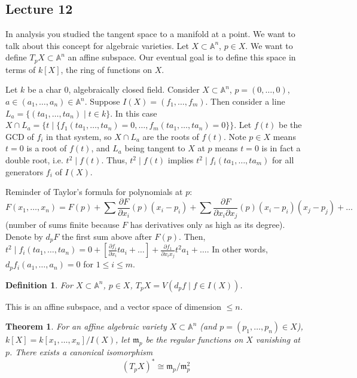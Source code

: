 \documentclass[12pt]{article}
\newcommand{\A}{\mathbb{A}}
\newcommand{\m}{\mathfrak{m}}
\newtheorem{definition}{Definition}[section]
\newtheorem{theorem}{Theorem}[section]
\begin{document}
    \subsection{Lecture 12}
    In analysis you studied the tangent space to a manifold at a point. We want to talk about this concept for algebraic varieties. Let $X \subset \A^n$, $p \in X$. We want to define $T_pX \subset \A^n$ an affine subspace. Our eventual goal is to define this space in terms of $k[X]$, the ring of functions on $X$. \par
    Let $k$ be a char 0, algebraically closed field. Consider $X \subset \A^n$, $p = (0, \dots, 0)$, $a \in (a_1, \dots, a_n) \in \A^n$. Suppose $I(X) = (f_1, \dots, f_m)$. Then consider a line $L_a = \{(ta_1, \dots, ta_n) \mid t \in k\}$. In this case $X \cap L_a = \{t \mid \{f_1(ta_1, \dots, ta_n) = 0, \dots, f_m(ta_1, \dots, ta_n) = 0\}\}$. Let $f(t)$ be the GCD of $f_i$ in that system, so $X \cap L_a$ are the roots of $f(t)$. Note $p \in X$ means $t = 0$ is a root of $f(t)$, and $L_a$ being tangent to $X$ at $p$ means $t = 0$ is in fact a double root, i.e. $t^2 \mid f(t)$.  Thus, $t^2\mid f(t)$ implies $t^2 \mid f_i(ta_1,\dots, ta_m)$ for all generators $f_i$ of $I(X)$. \par
    Reminder of Taylor's formula for polynomials at $p$:
    $$F(x_1, \dots, x_n) = F(p) + \sum \frac{\partial F}{\partial x_i}(p)(x_i - p_i) + \sum\frac{\partial F}{\partial x_i \partial x_j}(p) (x_i - p_i)(x_j - p_j) + \dots $$
    (number of sums finite because $F$ has derivatives only as high as its degree). Denote by $d_pF$ the first sum above after $F(p)$. Then, $t^2 \mid f_i(ta_1, \dots, ta_n) = 0 + [\frac{\partial f_i}{\partial x_i}ta_i + \dots] + \frac{\partial f_1}{\partial x_i x_j}t^2 a_1 + \dots$. In other words, $d_pf_i(a_1, \dots, a_n) = 0$ for $1 \leq i \leq m$.
    \begin{definition}
        For $X \subset \A^n$, $p \in X$, $T_pX = V(d_pf \mid f \in I(X))$.
    \end{definition}
    This is an affine subspace, and a vector space of dimension $\leq n$.
    \begin{theorem}
        For an affine algebraic variety $X \subset \A^n$ (and $p = (p_1, \dots, p_n) \in X$), $k[X] = k[x_1, \dots, x_n]/I(X)$, let $\mathfrak{m}_p$ be the regular functions on $X$ vanishing at $p$. There exists a canonical isomorphism
        $$(T_pX)^* \cong \m_p/\m_p^2$$
    \end{theorem}
\end{document}
